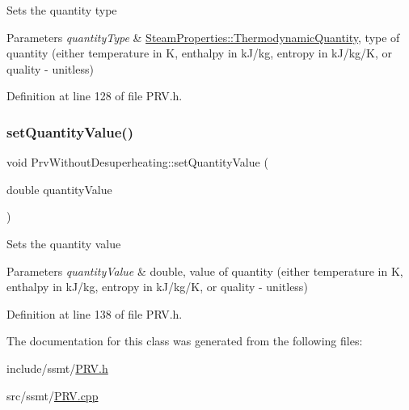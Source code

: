 Sets the quantity type


\begin{DoxyParams}{Parameters}
{\em quantity\+Type} & \hyperlink{class_steam_properties_ae0294bedf7d178c2d8fb6aed0f62fbff}{Steam\+Properties\+::\+Thermodynamic\+Quantity}, type of quantity (either temperature in K, enthalpy in k\+J/kg, entropy in k\+J/kg/K, or quality -\/ unitless) \\
\hline
\end{DoxyParams}


Definition at line 128 of file P\+R\+V.\+h.

\mbox{\label{class_prv_without_desuperheating_a5ed2d0f0f558705d482ed0502131757f}} 
\subsubsection{\texorpdfstring{set\+Quantity\+Value()}{setQuantityValue()}}
{\footnotesize\ttfamily void Prv\+Without\+Desuperheating\+::set\+Quantity\+Value (\begin{DoxyParamCaption}\item[{double}]{quantity\+Value }\end{DoxyParamCaption})\hspace{0.3cm}{\ttfamily [inline]}}

Sets the quantity value


\begin{DoxyParams}{Parameters}
{\em quantity\+Value} & double, value of quantity (either temperature in K, enthalpy in k\+J/kg, entropy in k\+J/kg/K, or quality -\/ unitless) \\
\hline
\end{DoxyParams}


Definition at line 138 of file P\+R\+V.\+h.



The documentation for this class was generated from the following files\+:\begin{DoxyCompactItemize}
\item 
include/ssmt/\hyperlink{_p_r_v_8h}{P\+R\+V.\+h}\item 
src/ssmt/\hyperlink{_p_r_v_8cpp}{P\+R\+V.\+cpp}\end{DoxyCompactItemize}
